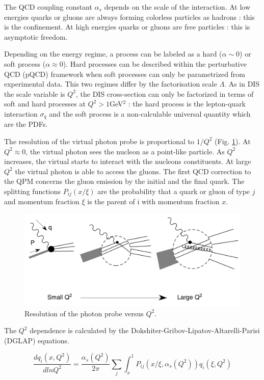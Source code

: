 The QCD coupling constant $\alpha_s$ depends on the scale of the interaction. At low energies quarks or gluons are always
forming colorless particles as hadrons : this is the confinement. At high energies quarks or gluons are free particles :
this is asymptotic freedom.

Depending on the energy regime, a process can be labeled as a hard ($\alpha \sim 0$) or soft process ($\alpha \approx 0$).
Hard processes can be described within the perturbative QCD (pQCD) framework when soft processes can only be parametrized
from experimental data. This two regimes differ by the factorisation scale $\Lambda$. As in DIS the scale variable is $Q^2$,
the DIS cross-section can only be factorized in terms of soft and hard processes at $Q^2>1$GeV$^2$ : the hard process is the
lepton-quark interaction $\sigma_q$ and the soft process is a non-calculable universal quantity which are the PDFs.

The resolution of the virtual photon probe is proportional to $1/Q^2$ (Fig. \ref{pic:Q2res}). At $Q^2 \approx 0$, the virtual photon sees the
nucleon as a point-like particle. As $Q^2$ increases, the virtual starts to interact with the nucleons constituents. At large $Q^2$
the virtual photon is able to access the gluons. The first QCD correction to the QPM concerns the gluon emission by the initial and
the final quark. The splitting functions $P_{ij}(x/\xi)$ are the probability that a quark or gluon of type $j$ and momentum fraction
$\xi$ is the parent of i with momentum fraction $x$.

\begin{figure}[!h]
  \centering
	\includegraphics[scale=0.6]{./gfx/Q2res.png}
	\caption{Resolution of the photon probe versus $Q^2$.}
	\label{pic:Q2res}
\end{figure}

The $Q^2$ dependence is calculated by the Dokshiter-Gribov-Lipatov-Altarelli-Parisi (DGLAP) equations.

\begin{equation}
  \frac{dq_i(x,Q^2)}{dlnQ^2} = \frac{\alpha_s(Q^2)}{2\pi}\sum\limits_{j}\int_{x}^{1}P_{ij}(x/\xi,\alpha_s(Q^2))q_i(\xi,Q^2)
\end{equation}

